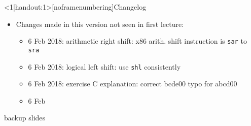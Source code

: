 {
\begin{frame}<1|handout:1>[noframenumbering]{Changelog}
    \begin{itemize}
        \item Changes made in this version not seen in first lecture:
        \begin{itemize}
            \item 6 Feb 2018: arithmetic right shift: x86 arith. shift instruction is \texttt{sar} to \texttt{sra}
            \item 6 Feb 2018: logical left shift: use {\tt shl} consistently
            \item 6 Feb 2018: exercise C explanation: correct bcde00 typo for  abcd00
            \item 6 Feb
        \end{itemize}
    \end{itemize}
\end{frame}
}







































\begin{frame}{backup slides}
\end{frame}








